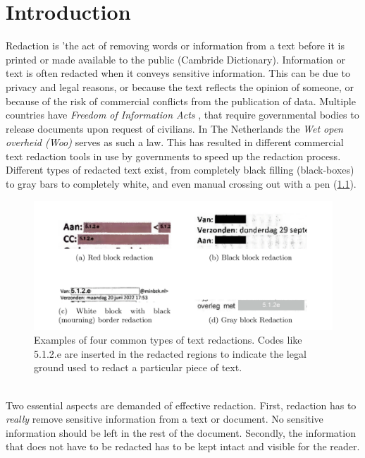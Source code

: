 \chapter{Introduction}

Redaction is 'the act of removing words or information from a text before it is printed or made available to the public (Cambride Dictionary). Information or text is often redacted when it conveys sensitive information. This can be due to privacy and legal reasons, or because the text reflects the opinion of someone, or because of the risk of commercial conflicts from the publication of data. Multiple countries have \textit{Freedom of Information Acts} \cite{USAFia}, that require governmental bodies to release documents upon request of civilians. In The Netherlands the \textit{Wet open overheid (Woo)} \cite{WooWebsite} serves as such a law. This has resulted in different commercial text redaction tools in use by governments to speed up the redaction process. Different types of redacted text exist, from completely black filling (black-boxes) to gray bars to completely white, and even manual crossing out with a pen 
(\ref{fig:redactionExamples}).
\begin{figure}[h]
\includegraphics[width=\textwidth]{media/img.png}
\centering
\caption{Examples of four common types of text redactions. Codes like 5.1.2.e are inserted in the redacted regions to indicate the legal ground used to redact a particular piece of text.}
\label{fig:redactionExamples}
\end{figure}\\
Two essential aspects are demanded of effective redaction. First, redaction has to \textit{really} remove sensitive information from a text or document. No sensitive information should be left in the rest of the document. Secondly, the information that does not have to be redacted has to be kept intact and visible for the reader. 
\\\\

